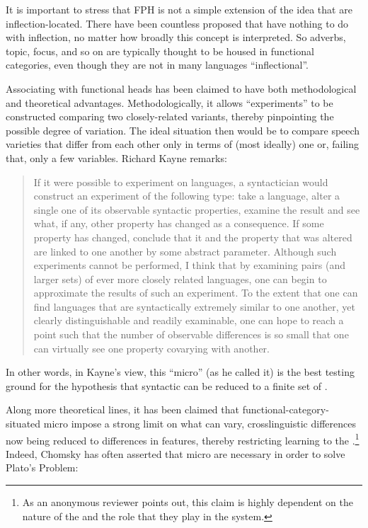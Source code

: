 \documentclass[output=paper,
modfonts
]{LSP/langsci}
\begin{document}
It is important to stress that FPH is not a simple extension of the idea
that  are inflection-located. There have been countless
 proposed that have nothing to do with inflection,
no matter how broadly this concept is interpreted. So adverbs, topic,
focus, and so on are typically thought to be housed in functional
categories, even though they are not in many languages ``inflectional''.

Associating  with functional heads has been claimed to have
both methodological and theoretical advantages. Methodologically, it
allows ``experiments'' to be constructed comparing two closely-related
variants, thereby pinpointing the possible degree of variation. The
ideal situation then would be to compare speech varieties that differ
from each other only in terms of (most ideally) one or, failing that,
only a few variables. Richard Kayne remarks:

\begin{quote}
If it were possible to experiment on languages, a syntactician would
construct an experiment of the following type: take a language, alter a
single one of its observable syntactic properties, examine the result
and see what, if any, other property has changed as a consequence. If
some property has changed, conclude that it and the property that was
altered are linked to one another by some abstract parameter. Although
such experiments cannot be performed, I think that by examining pairs
(and larger sets) of ever more closely related languages, one can begin
to approximate the results of such an experiment. To the extent that one
can find languages that are syntactically extremely similar to one
another, yet clearly distinguishable and readily examinable, one can
hope to reach a point such that the number of observable differences is
so small that one can virtually see one property covarying with another. \citep[5--6]{kayne2000}
\end{quote}

In other words, in Kayne's view, this ``micro'' (as he
called it) is the best testing ground for the hypothesis that syntactic
 can be reduced to a finite set of .

Along more theoretical lines, it has been claimed that
functional-category-situated micro impose a strong limit on
what can vary, crosslinguistic differences now being reduced to
differences in features, thereby restricting learning to the 
\citep{kayne2000,roberts2010,thornton2013}.\footnote{As an anonymous reviewer points out, this claim is
  highly dependent on the nature of the  and the role that they
  play in the system.} Indeed, Chomsky has often asserted that
micro are necessary in order to solve Plato's Problem:
\end{document}
